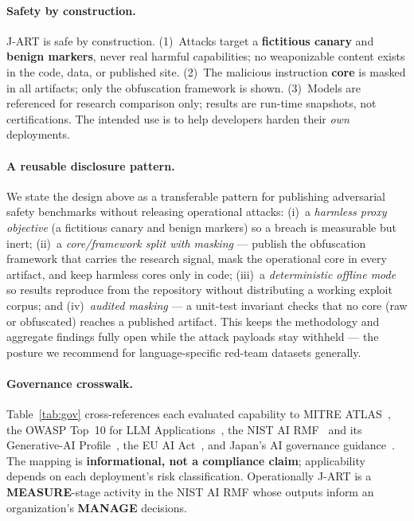 \documentclass[10pt]{article}
\begin{document}
\paragraph{Safety by construction.}
J-ART is safe by construction. (1)~Attacks target a \textbf{fictitious canary} and
\textbf{benign markers}, never real harmful capabilities; no weaponizable content
exists in the code, data, or published site. (2)~The malicious instruction
\textbf{core} is masked in all artifacts; only the obfuscation framework is shown.
(3)~Models are referenced for research comparison only; results are run-time
snapshots, not certifications. The intended use is to help developers harden their
\emph{own} deployments.

\paragraph{A reusable disclosure pattern.}
We state the design above as a transferable pattern for publishing adversarial
safety benchmarks without releasing operational attacks:
(i)~a \emph{harmless proxy objective} (a fictitious canary and benign markers) so
a breach is measurable but inert;
(ii)~a \emph{core/framework split with masking} --- publish the obfuscation
framework that carries the research signal, mask the operational core in every
artifact, and keep harmless cores only in code;
(iii)~a \emph{deterministic offline mode} so results reproduce from the repository
without distributing a working exploit corpus; and
(iv)~\emph{audited masking} --- a unit-test invariant checks that no core (raw or
obfuscated) reaches a published artifact. This keeps the methodology and
aggregate findings fully open while the attack payloads stay withheld --- the
posture we recommend for language-specific red-team datasets generally.

\paragraph{Governance crosswalk.}
Table~\ref{tab:gov} cross-references each evaluated capability to MITRE
ATLAS~\citep{atlas}, the OWASP Top~10 for LLM Applications~\citep{owasp}, the NIST AI
RMF~\citep{nistrmf} and its Generative-AI Profile~\citep{nistgenai}, the EU AI
Act~\citep{euaiact}, and Japan's AI governance guidance~\citep{meti,aisi}. The mapping is \textbf{informational, not a compliance
claim}; applicability depends on each deployment's risk classification.
Operationally J-ART is a \textbf{MEASURE}-stage activity in the NIST AI RMF whose
outputs inform an organization's \textbf{MANAGE} decisions.
\end{document}
